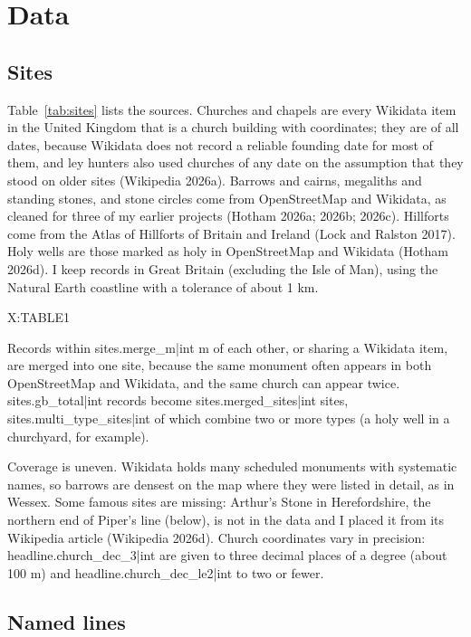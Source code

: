 \documentclass[11pt,a4paper]{article}
\begin{document}
\section{Data}

\subsection{Sites}

Table~\ref{tab:sites} lists the sources. Churches and chapels are every Wikidata item in the United Kingdom that is a church building with coordinates; they are of all dates, because Wikidata does not record a reliable founding date for most of them, and ley hunters also used churches of any date on the assumption that they stood on older sites (Wikipedia 2026a). Barrows and cairns, megaliths and standing stones, and stone circles come from OpenStreetMap and Wikidata, as cleaned for three of my earlier projects (Hotham 2026a; 2026b; 2026c). Hillforts come from the Atlas of Hillforts of Britain and Ireland (Lock and Ralston 2017). Holy wells are those marked as holy in OpenStreetMap and Wikidata (Hotham 2026d). I keep records in Great Britain (excluding the Isle of Man), using the Natural Earth coastline with a tolerance of about 1 km.

{{X:TABLE1}}

Records within {{sites.merge_m|int}} m of each other, or sharing a Wikidata item, are merged into one site, because the same monument often appears in both OpenStreetMap and Wikidata, and the same church can appear twice. {{sites.gb_total|int}} records become {{sites.merged_sites|int}} sites, {{sites.multi_type_sites|int}} of which combine two or more types (a holy well in a churchyard, for example).

Coverage is uneven. Wikidata holds many scheduled monuments with systematic names, so barrows are densest on the map where they were listed in detail, as in Wessex. Some famous sites are missing: Arthur's Stone in Herefordshire, the northern end of Piper's line (below), is not in the data and I placed it from its Wikipedia article (Wikipedia 2026d). Church coordinates vary in precision: {{headline.church_dec_3|int}} are given to three decimal places of a degree (about 100 m) and {{headline.church_dec_le2|int}} to two or fewer.

\subsection{Named lines}
\end{document}
